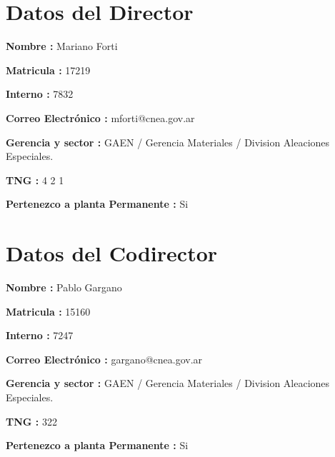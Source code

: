 \section*{Datos del Director}


\textbf{Nombre :}    Mariano Forti

\textbf{Matricula :}  17219

\textbf{Interno :}  7832

\textbf{Correo Electrónico :}  mforti@cnea.gov.ar

\textbf{Gerencia y sector : }  GAEN / Gerencia Materiales
     / Division Aleaciones Especiales.

\textbf{TNG :}  4 2 1

\textbf{Pertenezco a planta Permanente :} Si


\section*{Datos del Codirector}

\textbf{Nombre : }   Pablo Gargano 

\textbf{Matricula : }  15160

\textbf{Interno : }  7247 

\textbf{Correo Electrónico : }  gargano@cnea.gov.ar

\textbf{Gerencia y sector : }  GAEN / Gerencia Materiales
     / Division Aleaciones Especiales.

\textbf{TNG :} 322

\textbf{Pertenezco a planta Permanente : } Si

